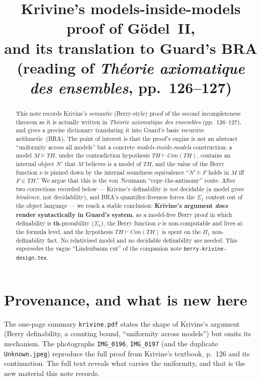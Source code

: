 \documentclass[11pt]{article}
\title{Krivine's models-inside-models proof of G\"odel~II,\\
and its translation to Guard's BRA\\
\large{(reading of \emph{Th\'eorie axiomatique des ensembles}, pp.~126--127)}}
\author{}
\date{}
\theoremstyle{plain}
\theoremstyle{definition}
\theoremstyle{remark}
\newcommand{\Con}{\mathit{Con}}
\newcommand{\Thy}{\mathit{TH}}
\newcommand{\thmT}{\mathbf{th}}
\newcommand{\sat}{\models}
\begin{document}
\maketitle

\begin{abstract}
This note records Krivine's \emph{semantic} (Berry-style) proof of the
second incompleteness theorem as it is actually written in
\emph{Th\'eorie axiomatique des ensembles} (pp.~126--127), and gives a
precise dictionary translating it into Guard's basic recursive
arithmetic~(BRA).  The point of interest is that the proof's engine is
not an abstract ``uniformity across all models'' but a concrete
\emph{models-inside-models} construction: a model $M\sat\Thy$, under the
contradiction hypothesis $\Thy\vdash\Con(\Thy)$, contains an internal
object $N'$ that $M$ believes is a model of $\Thy$, and the value of the
Berry function $\nu$ is pinned down by the internal soundness
equivalence ``$N'\sat F$ holds in $M$ iff $F\in\Thy$.''  We argue that
this is the von~Neumann ``copy-the-antinomy'' route.  After two
corrections recorded below --- Krivine's definability is \emph{not}
decidable (a model gives \emph{bivalence}, not decidability), and BRA's
quantifier-freeness forces the $\Sigma_1$ content out of the object
language --- we reach a stable conclusion: \textbf{Krivine's argument
\emph{does} render syntactically in Guard's system}, as a model-free
Berry proof in which definability is $\thmT$-provability ($\Sigma_1$), the
Berry function $\nu$ is non-computable and lives at the formula level, and
the hypothesis $\Thy\vdash\Con(\Thy)$ is spent on the $\Pi_1$
non-definability fact.  No relativised model and no decidable definability
are needed.  This supersedes the vague ``Lindenbaum cut'' of the companion
note \texttt{berry-krivine-design.tex}.
\end{abstract}

\section{Provenance, and what is new here}

The one-page summary \texttt{krivine.pdf} states the shape of Krivine's
argument (Berry definability, a counting bound, ``uniformity across
models'') but omits its mechanism.  The photographs \texttt{IMG\_0196},
\texttt{IMG\_0197} (and the duplicate \texttt{Unknown.jpeg}) reproduce
the full proof from Krivine's textbook, p.~126 and its continuation.
The full text reveals what carries the uniformity, and that is the new
material this note records.
\end{document}

